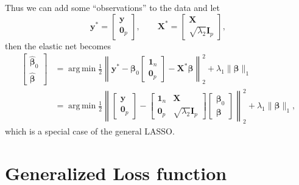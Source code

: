 \documentclass[11pt]{article}
\newcommand{\by}{\bm{y}}
\newcommand{\bX}{\bm{X}}
\newcommand{\bbeta}{\bm{\beta}}
\DeclareMathOperator*{\argmin}{arg\,min}
\begin{document}
Thus we can add some ``observations'' to the data and let
$$\by^\ast = \begin{bmatrix}
\by \\
\bm0_p
\end{bmatrix},\qquad \bX^\ast =
\begin{bmatrix}
\bX \\
\sqrt{\lambda_2} \bm{I}_p
\end{bmatrix}, $$
then the elastic net becomes
	\begin{equation}
		\begin{aligned}
		\begin{bmatrix}
		\hat{\bbeta}_0 \\
		\hat{\bbeta}
		\end{bmatrix} &= \argmin\frac{1}{2} \left\|\by^\ast - \bbeta_0
		\begin{bmatrix}
		\bm{1}_n \\
		\bm{0}_p
		\end{bmatrix} - \bX^\ast\bbeta\right\|_2^2 + \lambda_1 \|\bbeta\|_1  \\
		&= \argmin\frac{1}{2} \left\|
		\begin{bmatrix}
		\by \\
		\bm0_p
		\end{bmatrix}
		- 
		\begin{bmatrix}
		\bm{1}_n & \bX \\
		\bm{0}_p &\sqrt{\lambda_2} \bm{I}_p
		\end{bmatrix}  
		\begin{bmatrix}
		\bbeta_0 \\
		\bbeta
		\end{bmatrix} 
		\right \|_2^2 + \lambda_1 \|\bbeta\|_1,
		\end{aligned}
	\end{equation}
which is a special case of the general LASSO.

\section{Generalized Loss function}
\end{document}
